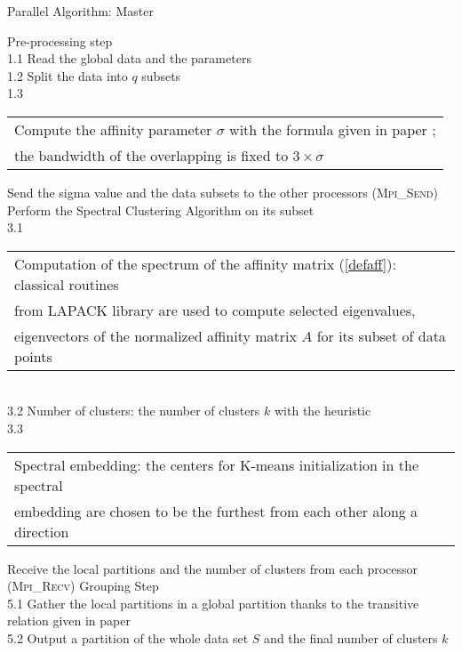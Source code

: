 \documentclass{llncs}
\begin{document}
\begin{algorithm}
\caption{Parallel Algorithm: Master}
\label{algo-master}
\begin{algorithmic}[1]
  \STATE Pre-processing step\\
        1.1 Read the global data and the parameters\\
        1.2 Split the data into $q$ subsets\\
        1.3 \begin{tabular}[t]{l}
            Compute the affinity parameter $\sigma$ with the formula given 
            in paper \cite{mouysset3}; \\
            the bandwidth of the overlapping is fixed to
            $3\times \sigma$ 
            \end{tabular}
  \STATE Send the sigma value and the data subsets to the other processors
         (\textsc{Mpi\_Send})
  \STATE Perform the Spectral Clustering Algorithm on its subset\\
         3.1 \begin{tabular}[t]{l}
             Computation of the spectrum of the affinity matrix
             (\ref{defaff}):
             classical routines \\
             from LAPACK library \cite{anderson1999lapack}
             are used to compute selected eigenvalues,\\
             eigenvectors of the normalized  affinity matrix $A$ for its
             subset of data points
            \end{tabular}\\
         3.2 {Number of clusters:} the number of clusters $k$ with the heuristic \cite{mouysset3}\\
         3.3 \begin{tabular}[t]{l}
             {Spectral embedding:}
             the centers for K-means initialization in the spectral \\
             embedding are 
             chosen to be the furthest from each other along a direction
             \end{tabular}
  \STATE Receive the local partitions and the number of clusters from each
         processor (\textsc{Mpi\_Recv})
  \STATE Grouping Step\\
         5.1 Gather the local partitions in a global
         partition thanks to the transitive relation given in paper \cite{mouysset3}\\
         5.2 Output a partition of the whole data
         set $S$ and the final number of clusters $k$
\end{algorithmic}
\end{algorithm}
\end{document}
